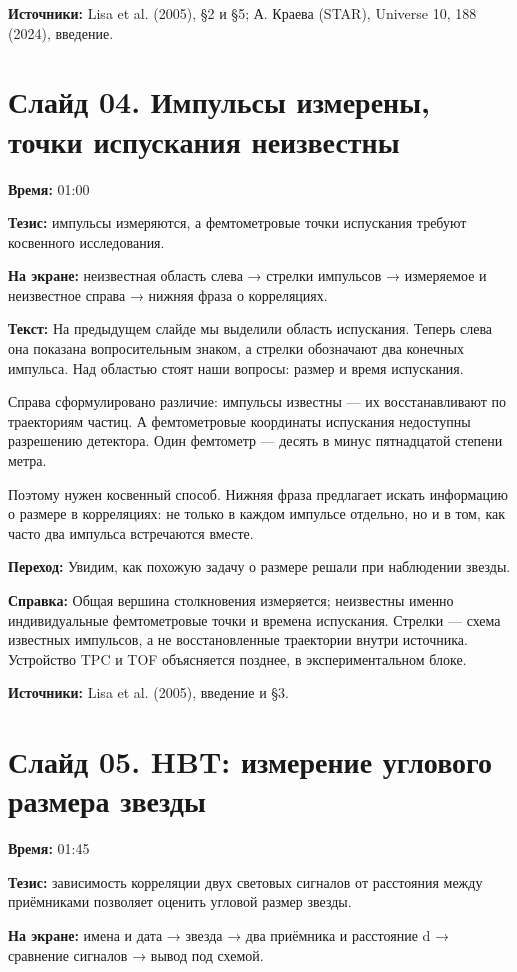 \documentclass[11pt,a4paper]{article}
\begin{document}
\textbf{Источники:} Lisa et al. (2005), §2 и §5; А. Краева (STAR), Universe 10, 188 (2024), введение.

\clearpage
\section*{Слайд 04. Импульсы измерены, точки испускания неизвестны}
\textbf{Время:} 01:00

\textbf{Тезис:} импульсы измеряются, а фемтометровые точки испускания требуют косвенного исследования.

\textbf{На экране:} неизвестная область слева → стрелки импульсов → измеряемое и неизвестное справа → нижняя фраза о корреляциях.

\textbf{Текст:} На предыдущем слайде мы выделили область испускания. Теперь слева она показана вопросительным знаком, а стрелки обозначают два конечных импульса. Над областью стоят наши вопросы: размер и время испускания.

Справа сформулировано различие: импульсы известны — их восстанавливают по траекториям частиц. А фемтометровые координаты испускания недоступны разрешению детектора. Один фемтометр — десять в минус пятнадцатой степени метра.

Поэтому нужен косвенный способ. Нижняя фраза предлагает искать информацию о размере в корреляциях: не только в каждом импульсе отдельно, но и в том, как часто два импульса встречаются вместе.

\textbf{Переход:} Увидим, как похожую задачу о размере решали при наблюдении звезды.

\textbf{Справка:} Общая вершина столкновения измеряется; неизвестны именно индивидуальные фемтометровые точки и времена испускания. Стрелки — схема известных импульсов, а не восстановленные траектории внутри источника. Устройство TPC и TOF объясняется позднее, в экспериментальном блоке.

\textbf{Источники:} Lisa et al. (2005), введение и §3.

\clearpage
\section*{Слайд 05. HBT: измерение углового размера звезды}
\textbf{Время:} 01:45

\textbf{Тезис:} зависимость корреляции двух световых сигналов от расстояния между приёмниками позволяет оценить угловой размер звезды.

\textbf{На экране:} имена и дата → звезда → два приёмника и расстояние d → сравнение сигналов → вывод под схемой.
\end{document}
